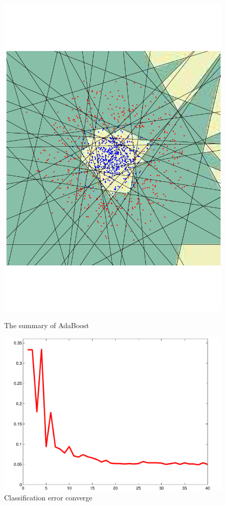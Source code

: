 \begin{figure}
\begin{center}
 \includegraphics[angle=270, scale=0.166]{ch4/figures/91.pdf}\\
\end{center}
\caption{The summary of AdaBoost}
\label{fig:howtostrongclassifier}
\end{figure} 

\begin{figure}
 \begin{center}
  \includegraphics[scale=0.33]{ch4/figures/92.pdf}
 \end{center}
\caption{Classification error converge}
\label{fig:errorconverge}
\end{figure} 

